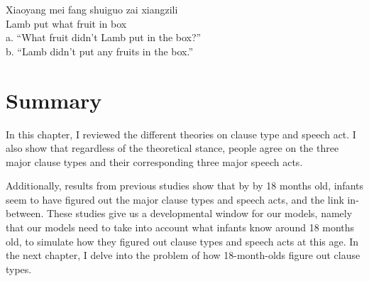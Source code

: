 \gll Xiaoyang mei	fang	 shuiguo zai	xiangzili\\
Lamb \Neg{}	put	what		fruit		in	box\\
\trans a. ``What fruit didn't Lamb put in the box?''\\
b.	``Lamb didn't put any fruits in the box.''
\eex

\section{Summary}
In this chapter, I reviewed the different theories on clause type and speech act. I also show that regardless of the theoretical stance, people agree on the three major clause types and their corresponding three major speech acts. 

Additionally, results from previous studies show that by by 18 months old, infants seem to have figured out the major clause types and speech acts, and the link in-between. These studies give us a developmental window for our models, namely that our models need to take into account what infants know around 18 months old, to simulate how they figured out clause types and speech acts at this age. In the next chapter, I delve into the problem of how 18-month-olds figure out clause types.






